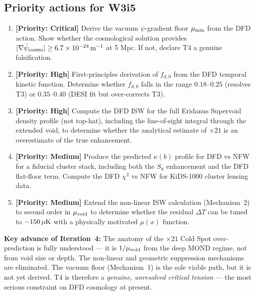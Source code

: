 \documentclass[11pt]{article}
\newcommand{\ee}[1]{\times 10^{#1}}
\newcommand{\mufd}{\mu}
\newcommand{\mumin}{\mu_{\rm min}}
\newcommand{\deltaT}{\Delta T}
\newcommand{\psibar}{\bar{\psi}_{\rm cosmo}}
\begin{document}
\subsection{Priority actions for W3i5}

\begin{enumerate}
  \item \textbf{[Priority: Critical]} Derive the vacuum $\psi$-gradient
    floor $\mumin$ from the DFD action.  Show whether the cosmological
    solution provides $|\nabla\psibar| \geq 6.7\ee{-24}\,{\rm m}^{-1}$
    at 5 Mpc.  If not, declare T4 a genuine falsification.

  \item \textbf{[Priority: High]} First-principles derivation of $f_{d,0}$
    from the DFD temporal kinetic function.  Determine whether
    $f_{d,0}$ falls in the range $0.18$--$0.25$ (resolves T3)
    or $0.35$--$0.40$ (DESI fit but over-corrects T3).

  \item \textbf{[Priority: High]} Compute the DFD ISW for the full
    Eridanus Supervoid density profile (not top-hat), including the
    line-of-sight integral through the extended void, to determine
    whether the analytical estimate of $\times 21$ is an overestimate
    of the true enhancement.

  \item \textbf{[Priority: Medium]} Produce the predicted $\kappa(b)$
    profile for DFD vs NFW for a fiducial cluster stack, including both
    the $S_8$ enhancement and the DFD flat-floor term.  Compute the
    DFD $\chi^2$ vs NFW for KiDS-1000 cluster lensing data.

  \item \textbf{[Priority: Medium]} Extend the non-linear ISW calculation
    (Mechanism~2) to second order in $\mufd_{\rm void}$ to determine
    whether the residual $\deltaT$ can be tuned to $-150\,\mu{\rm K}$
    with a physically motivated $\mu(x)$ function.
\end{enumerate}

\bigskip\noindent
\textbf{Key advance of Iteration~4:} The anatomy of the $\times 21$
Cold Spot over-prediction is fully understood --- it is $1/\mufd_{\rm void}$
from the deep MOND regime, not from void size or depth.  The non-linear
and geometric suppression mechanisms are eliminated.  The vacuum floor
(Mechanism~1) is the sole viable path, but it is not yet derived.
T4 is therefore a \emph{genuine, unresolved critical tension} --- the
most serious constraint on DFD cosmology at present.
\end{document}
